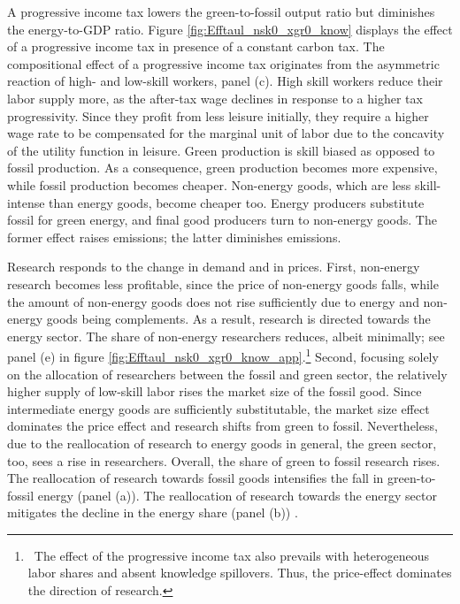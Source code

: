  A progressive income tax lowers the green-to-fossil output ratio but diminishes the energy-to-GDP ratio. Figure \ref{fig:Efftaul_nsk0_xgr0_know} displays the effect of a progressive income tax in presence of a constant carbon tax. 
 The compositional effect of a progressive income tax originates from the asymmetric reaction of high- and low-skill workers, panel (c). High skill workers reduce their labor supply more, as the after-tax wage declines in response to a higher tax progressivity. Since they profit from less leisure initially, they require a higher wage rate to be compensated for the marginal unit of labor due to the concavity of the utility function in leisure. %
 Green production is skill biased as opposed to fossil production.
 As a  consequence, green production becomes more expensive, while fossil production becomes cheaper. Non-energy goods, which are less skill-intense than energy goods, become cheaper too. Energy producers substitute fossil for green energy, and final good producers turn to non-energy goods. The former effect raises emissions; the latter diminishes emissions.
 
 
 Research responds to the change in demand and in prices. First, non-energy research becomes less profitable, since the price of non-energy goods falls, while the amount of non-energy goods does not rise sufficiently due to energy and non-energy goods being complements. As a result, research is directed towards the energy sector. The share of non-energy researchers reduces, albeit minimally; see panel (e) in figure \ref{fig:Efftaul_nsk0_xgr0_know_app}.\footnote{\ The effect of the progressive income tax also prevails with heterogeneous labor shares and absent knowledge spillovers. Thus, the price-effect dominates the direction of research.} Second, focusing solely on the allocation of researchers between the fossil and green sector, the relatively higher supply of low-skill labor rises the market size of the fossil good. Since intermediate energy goods are sufficiently substitutable, the market size effect dominates the price effect and research shifts from green to fossil. Nevertheless, due to the reallocation of research to energy goods in general, the green sector, too, sees a rise in researchers. Overall, the share of green to fossil research rises. The reallocation of research towards fossil goods intensifies the fall in green-to-fossil energy (panel (a)). The reallocation of research towards the energy sector mitigates the decline in the energy share (panel (b)) . 
 
